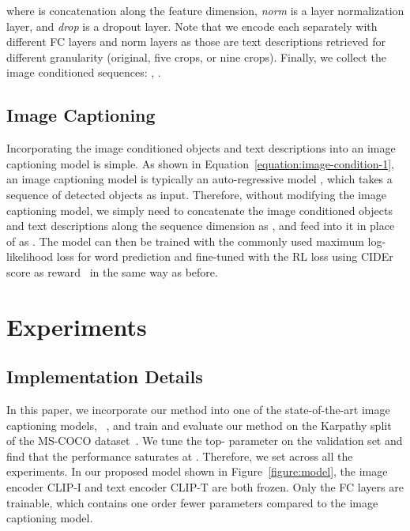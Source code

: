 \documentclass[10pt,twocolumn,letterpaper]{article}
\begin{document}
where  is concatenation along the feature dimension, \textit{norm} is a layer normalization layer, and \textit{drop} is a dropout layer.
Note that we encode each  separately with different FC layers and norm layers as those are text descriptions retrieved for different granularity (original, five crops, or nine crops).
Finally, we collect the image conditioned sequences: , .

\subsection{Image Captioning}

Incorporating the image conditioned objects  and text descriptions  into an image captioning model is simple.
As shown in Equation~\ref{equation:image-condition-1}, an image captioning model is typically an auto-regressive model , which takes a sequence of detected objects  as input.
Therefore, without modifying the image captioning model, we simply need to concatenate the image conditioned objects  and text descriptions  along the sequence dimension as , and feed  into it in place of  as .
The model can then be trained with the commonly used maximum log-likelihood loss for word prediction and fine-tuned with the RL loss using CIDEr score as reward~\cite{rennie2017self,cornia2020meshed} in the same way as before.
 \section{Experiments}

\subsection{Implementation Details}
In this paper, we incorporate our method into one of the state-of-the-art image captioning models, ~\cite{cornia2020meshed}, and train and evaluate our method on the Karpathy split~\cite{karpathy2015deep} of the MS-COCO dataset~\cite{lin2014microsoft}.
We tune the top- parameter on the validation set and find that the performance saturates at .
Therefore, we set  across all the experiments.
In our proposed model shown in Figure~\ref{figure:model}, the image encoder CLIP-I and text encoder CLIP-T are both frozen.
Only the FC layers are trainable, which contains one order fewer parameters compared to the image captioning model.
\end{document}
